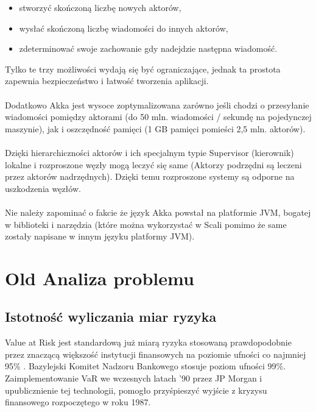 \documentclass[11pt,titlepage]{article}
\numberwithin{equation}{section}
\begin{document}
\begin{itemize}
  \item stworzyć skończoną liczbę nowych aktorów,
	\item wysłać skończoną liczbę wiadomości do innych aktorów,
	\item zdeterminować swoje zachowanie gdy nadejdzie następna wiadomość.

\end{itemize}
Tylko te trzy możliwości wydają się być ograniczające, jednak ta prostota zapewnia bezpieczeństwo i łatwość tworzenia aplikacji. \\
\\
Dodatkowo Akka jest wysoce zoptymalizowana zarówno jeśli chodzi o przesyłanie wiadomości pomiędzy aktorami (do 50 mln. wiadomości / sekundę na pojedynczej maszynie), jak i oszczędność pamięci (1 GB pamięci pomieści 2,5 mln. aktorów). \\
\\
Dzięki hierarchiczności aktorów i ich specjalnym typie Supervisor (kierownik) lokalne i rozproszone węzły mogą leczyć się same (Aktorzy podrzędni są leczeni przez aktorów nadrzędnych). Dzięki temu rozproszone systemy są odporne na uszkodzenia węzłów. \\
\\
Nie należy zapominać o fakcie że język Akka powstał na platformie JVM, bogatej w biblioteki i narzędzia (które można wykorzystać w Scali pomimo że same zostały napisane w innym języku platformy JVM).\\

\newpage
\section{Old Analiza problemu}



\subsection{Istotność wyliczania miar ryzyka}
Value at Risk jest standardową już miarą ryzyka stosowaną prawdopodobnie przez znaczącą większość instytucji finansowych na poziomie ufności co najmniej 95\% . Bazylejski Komitet Nadzoru Bankowego stosuje poziom ufności 99\%. Zaimplementowanie VaR we wczesnych latach '90 przez JP Morgan i upublicznienie tej technologii, pomogło przyśpieszyć wyjście z kryzysu finansowego rozpoczętego w roku 1987.\\
\\
\end{document}
